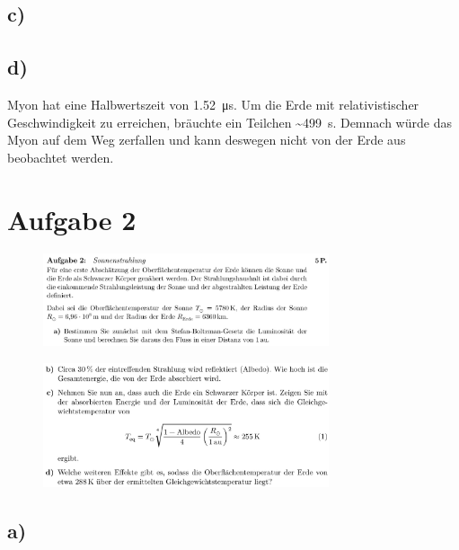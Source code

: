 \subsection{c)}

\subsection{d)}

    \justifying Myon hat eine Halbwertszeit von \SI{1.52}{\micro\second}. Um die Erde mit relativistischer Geschwindigkeit zu erreichen, bräuchte ein Teilchen 
    \textasciitilde \SI{499}{\second}. Demnach würde das Myon auf dem Weg zerfallen und kann deswegen nicht von der Erde aus beobachtet werden. 





\section{Aufgabe 2}

\begin{figure}[H]
    \centering
    \includegraphics[width=0.75\textwidth]{images/Aufgabe_2a.jpg}
    \label{fig:2}
\end{figure}

\begin{figure}[H]
    \centering
    \includegraphics[width=0.75\textwidth]{images/Aufgabe_2bcd.jpg}
    \label{fig:2}
\end{figure}

\subsection{a)}

